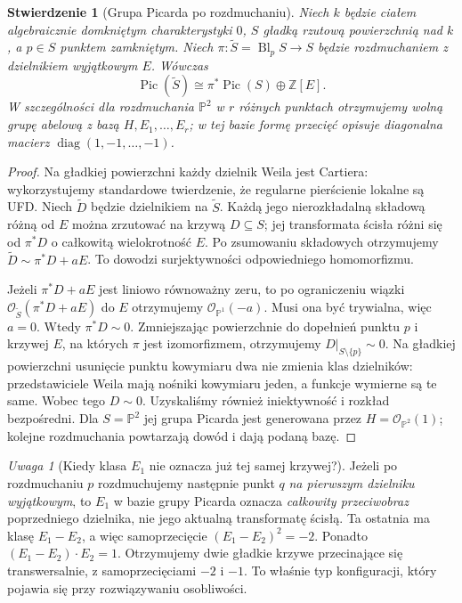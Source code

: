 \documentclass[11pt,a4paper,openany]{report}
\numberwithin{equation}{section}
\theoremstyle{plain}
\newtheorem{stwierdzenie}[twierdzenie]{Stwierdzenie}
\theoremstyle{definition}
\theoremstyle{remark}
\newtheorem{uwaga}[twierdzenie]{Uwaga}
\newcommand{\Z}{\mathbb Z}
\newcommand{\PP}{\mathbb P}
\begin{document}
\begin{stwierdzenie}[Grupa Picarda po rozdmuchaniu]
\label{st:ga6-pic-blowup}
Niech $k$ będzie ciałem algebraicznie domkniętym
charakterystyki $0$, $S$ gładką rzutową powierzchnią
nad $k$, a $p\in S$ punktem zamkniętym.
Niech $\pi:\widetilde S=\operatorname{Bl}_pS\to S$
będzie rozdmuchaniem z dzielnikiem wyjątkowym $E$.
Wówczas
\[
 \operatorname{Pic}(\widetilde S)\cong
 \pi^*\operatorname{Pic}(S)\oplus\Z[E].
\]
W szczególności dla rozdmuchania $\PP^2$ w $r$
różnych punktach otrzymujemy wolną grupę abelową
z bazą $H,E_1,\ldots,E_r$; w tej bazie formę
przecięć opisuje diagonalna macierz
$\operatorname{diag}(1,-1,\ldots,-1)$.
\end{stwierdzenie}
\begin{proof}
Na gładkiej powierzchni każdy dzielnik Weila jest
Cartiera: wykorzystujemy standardowe twierdzenie,
że regularne pierścienie lokalne są UFD. Niech
$\widetilde D$ będzie dzielnikiem na $\widetilde S$.
Każdą jego nierozkładalną składową różną od $E$
można zrzutować na krzywą $D\subseteq S$; jej
transformata ścisła różni się od $\pi^*D$ o
całkowitą wielokrotność $E$. Po zsumowaniu składowych
otrzymujemy $\widetilde D\sim\pi^*D+aE$.
To dowodzi surjektywności odpowiedniego homomorfizmu.

Jeżeli $\pi^*D+aE$ jest liniowo równoważny zeru,
to po ograniczeniu wiązki $\mathcal O_{\widetilde S}(\pi^*D+aE)$
do $E$ otrzymujemy $\mathcal O_{\PP^1}(-a)$.
Musi ona być trywialna, więc $a=0$. Wtedy
$\pi^*D\sim0$. Zmniejszając powierzchnie do
dopełnień punktu $p$ i krzywej $E$, na których
$\pi$ jest izomorfizmem, otrzymujemy $D|_{S\setminus\{p\}}\sim0$.
Na gładkiej powierzchni usunięcie punktu kowymiaru
dwa nie zmienia klas dzielników: przedstawiciele
Weila mają nośniki kowymiaru jeden, a funkcje
wymierne są te same. Wobec tego $D\sim0$.
Uzyskaliśmy również iniektywność i rozkład bezpośredni.
Dla $S=\PP^2$ jej grupa Picarda jest generowana
przez $H=\mathcal O_{\PP^2}(1)$; kolejne rozdmuchania
powtarzają dowód i dają podaną bazę.
\end{proof}

\begin{uwaga}[Kiedy klasa $E_1$ nie oznacza już tej samej krzywej?]
\label{uw:ga6-infinitely-near}
Jeżeli po rozdmuchaniu $p$ rozdmuchujemy następnie punkt
$q$ \emph{na pierwszym dzielniku wyjątkowym}, to
$E_1$ w bazie grupy Picarda oznacza \emph{całkowity
przeciwobraz} poprzedniego dzielnika, nie jego aktualną
transformatę ścisłą. Ta ostatnia ma klasę $E_1-E_2$,
a więc samoprzecięcie $(E_1-E_2)^2=-2$.
Ponadto $(E_1-E_2)\cdot E_2=1$. Otrzymujemy dwie
gładkie krzywe przecinające się transwersalnie,
z samoprzecięciami $-2$ i $-1$. To właśnie typ
konfiguracji, który pojawia się przy rozwiązywaniu
osobliwości.
\end{uwaga}
\end{document}
